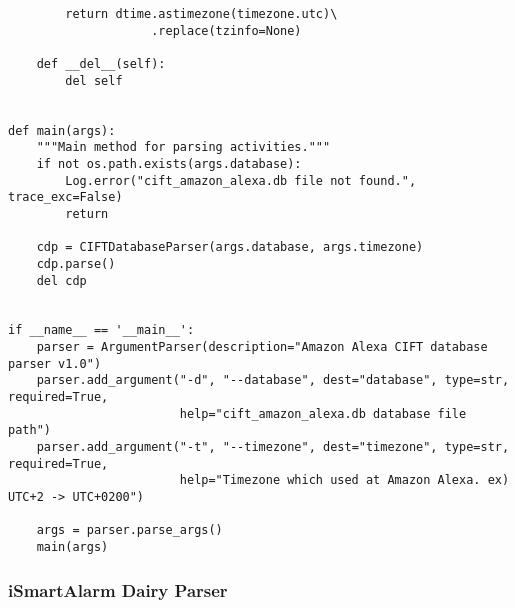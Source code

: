 \documentclass{easychair}
\begin{document}
\begin{lstlisting}
        return dtime.astimezone(timezone.utc)\
                    .replace(tzinfo=None)

    def __del__(self):
        del self


def main(args):
    """Main method for parsing activities."""
    if not os.path.exists(args.database):
        Log.error("cift_amazon_alexa.db file not found.", trace_exc=False)
        return

    cdp = CIFTDatabaseParser(args.database, args.timezone)
    cdp.parse()
    del cdp


if __name__ == '__main__':
    parser = ArgumentParser(description="Amazon Alexa CIFT database parser v1.0")
    parser.add_argument("-d", "--database", dest="database", type=str, required=True,
                        help="cift_amazon_alexa.db database file path")
    parser.add_argument("-t", "--timezone", dest="timezone", type=str, required=True,
                        help="Timezone which used at Amazon Alexa. ex) UTC+2 -> UTC+0200")

    args = parser.parse_args()
    main(args)

\end{lstlisting}


    
\subsubsection{iSmartAlarm Dairy Parser}
\end{document}

